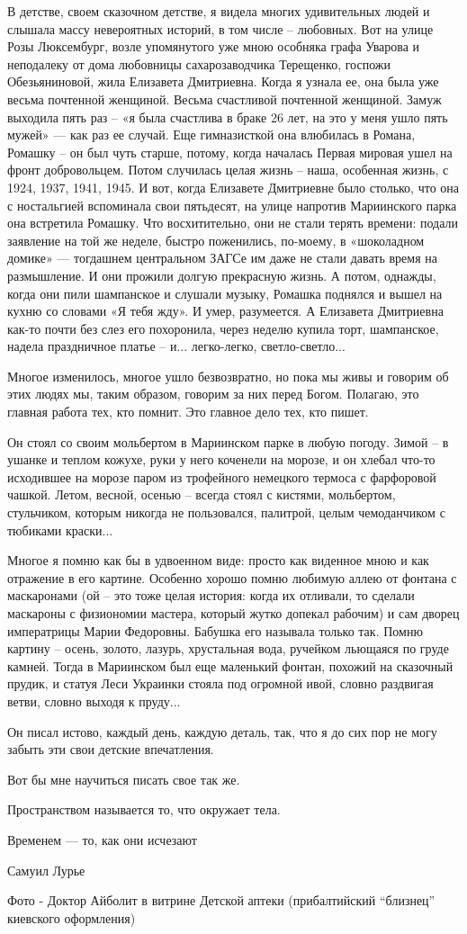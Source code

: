 В детстве, своем сказочном детстве, я видела многих удивительных людей и
слышала массу невероятных историй, в том числе – любовных. Вот на улице Розы
Люксембург, возле упомянутого уже мною особняка графа Уварова и неподалеку от
дома любовницы сахарозаводчика Терещенко, госпожи Обезьяниновой, жила Елизавета
Дмитриевна. Когда я узнала ее, она была уже весьма почтенной женщиной. Весьма
счастливой почтенной женщиной. Замуж выходила пять раз – «я была счастлива в
браке 26 лет, на это у меня ушло пять мужей» — как раз ее случай. Еще
гимназисткой она влюбилась в Романа, Ромашку – он был чуть старше, потому,
когда началась Первая мировая ушел на фронт добровольцем. Потом случилась целая
жизнь – наша, особенная жизнь, с 1924, 1937, 1941, 1945. И вот, когда Елизавете
Дмитриевне было столько, что она с ностальгией вспоминала свои пятьдесят, на
улице напротив Мариинского парка она встретила Ромашку. Что восхитительно, они
не стали терять времени: подали заявление на той же неделе, быстро поженились,
по-моему, в «шоколадном домике» — тогдашнем центральном ЗАГСе им даже не стали
давать время на размышление. И они прожили долгую прекрасную жизнь. А потом,
однажды, когда они пили шампанское и слушали музыку, Ромашка поднялся и вышел
на кухню со словами «Я тебя жду». И умер, разумеется. А Елизавета Дмитриевна
как-то почти без слез его похоронила, через неделю купила торт, шампанское,
надела праздничное платье – и... легко-легко, светло-светло...

Многое изменилось, многое ушло безвозвратно, но пока мы живы и говорим об этих
людях мы, таким образом, говорим за них перед Богом. Полагаю, это главная
работа тех, кто помнит. Это главное дело тех, кто пишет.

Он стоял со своим мольбертом в Мариинском парке в любую погоду. Зимой – в
ушанке и теплом кожухе, руки у него коченели на морозе, и он хлебал что-то
исходившее на морозе паром из трофейного немецкого термоса с фарфоровой чашкой.
Летом, весной, осенью – всегда стоял с кистями, мольбертом, стульчиком, которым
никогда не пользовался, палитрой, целым чемоданчиком с тюбиками краски...

Многое я помню как бы в удвоенном виде: просто как виденное мною и как
отражение в его картине. Особенно хорошо помню любимую аллею от фонтана с
маскаронами (ой – это тоже целая история: когда их отливали, то сделали
маскароны с физиономии мастера, который жутко допекал рабочим) и сам дворец
императрицы Марии Федоровны. Бабушка его называла только так. Помню картину –
осень, золото, лазурь, хрустальная вода, ручейком льющаяся по груде камней.
Тогда в Мариинском был еще маленький фонтан, похожий на сказочный прудик, и
статуя Леси Украинки стояла под огромной ивой, словно раздвигая ветви, словно
выходя к пруду...

Он писал истово, каждый день, каждую деталь, так, что я до сих пор не могу
забыть эти свои детские впечатления.

Вот бы мне научиться писать свое так же.

Пространством называется то, что окружает тела.

Временем — то, как они исчезают

Самуил Лурье

Фото - Доктор Айболит в витрине Детской аптеки (прибалтийский \enquote{близнец} киевского оформления)
